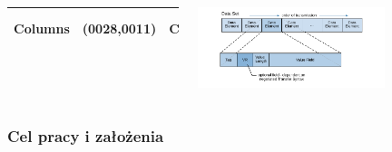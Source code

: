 \documentclass[aspectratio=169]{beamer}
\begin{document}
\begin{frame}
\begin{columns}
\begin{tabular}{|l|c|c|l|}
            Columns                   & (0028,0011)           & CS                 & Szerokość zdjęcia           \\\hline
        \end{tabular}
        \vspace{-1em}
        \includegraphics[trim={1.2cm 0.4cm 1.2cm 0.2cm},clip,width=0.7\textwidth]{img/dicom-dataelement002.pdf}
    \end{columns}
\end{frame}

\begin{frame}
    \frametitle{Cel pracy i założenia}
\end{frame}
\end{document}
